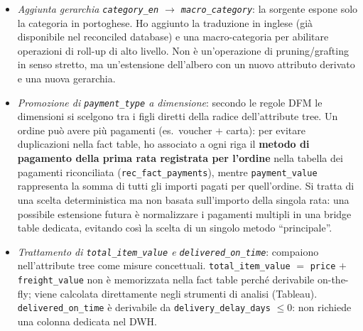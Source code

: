 \documentclass[12pt,a4paper]{article}
\begin{document}
\begin{enumerate}
\begin{itemize}
                utili nel reconciled database per auditing, ma privi di significato
                analitico nel DWH.
          \item \textit{Aggiunta gerarchia \texttt{category\_en} $\to$
                \texttt{macro\_category}}: la sorgente espone solo la categoria in
                portoghese. Ho aggiunto la traduzione in inglese (già disponibile nel
                reconciled database) e una macro-categoria per abilitare operazioni di
                roll-up di alto livello. Non è un'operazione di pruning/grafting in
                senso stretto, ma un'estensione dell'albero con un nuovo attributo
                derivato e una nuova gerarchia.
          \item \textit{Promozione di \texttt{payment\_type} a dimensione}: secondo le
                regole DFM le dimensioni si scelgono tra i figli diretti della radice
                dell'attribute tree. Un ordine può avere più pagamenti (es.\ voucher
                $+$ carta): per evitare duplicazioni nella fact table, ho associato a
                ogni riga il \textbf{metodo di pagamento della prima rata registrata
                per l'ordine} nella tabella dei pagamenti riconciliata
                (\texttt{rec\_fact\_payments}), mentre \texttt{payment\_value}
                rappresenta la somma di tutti gli importi pagati per quell'ordine.
                Si tratta di una scelta deterministica ma non basata sull'importo
                della singola rata: una possibile estensione futura è normalizzare i
                pagamenti multipli in una bridge table dedicata, evitando così la
                scelta di un singolo metodo ``principale''.
          \item \textit{Trattamento di \texttt{total\_item\_value} e
                \texttt{delivered\_on\_time}}: compaiono nell'attribute tree come misure
                concettuali. \texttt{total\_item\_value} $=$ \texttt{price} $+$
                \texttt{freight\_value} non è memorizzata nella fact table perché
                derivabile on-the-fly; viene calcolata direttamente negli strumenti di
                analisi (Tableau). \texttt{delivered\_on\_time} è derivabile da
                \texttt{delivery\_delay\_days} $\leq 0$: non richiede una colonna
                dedicata nel DWH.
        \end{itemize}


\end{enumerate}
\end{document}
